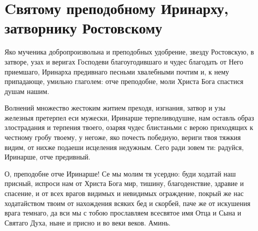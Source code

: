\section{Cвятому преподобному Иринарху, затворнику Ростовскому}\begin{mymulticols}


Яко мученика добропроизвольна и преподобных удобрение, звезду Ростовскую, в затворе, узах и веригах Господеви благоугодившаго и чудес благодать от Него приемшаго, Иринарха предивнаго песньми хвалебными почтим и, к нему припадающе, умильно глаголем: отче преподобне, моли Христа Бога спастися душам нашим. 


Волнений множество жестоким житием преходя, изгнания, затвор и узы железныя претерпел еси мужески, Иринарше терпеливодушне, нам оставль образ злострадания и терпения твоего, озаряя чудес блистаньми с верою приходящих к честному гробу твоему, у негоже, яко почесть победную, вериги твоя тяжкия видим, от нихже подаеши исцеления недужным. Сего ради зовем ти: радуйся, Иринарше, отче предивный. 


О, преподобне отче Иринарше! Се мы молим тя усердно: буди ходатай наш присный, испроси нам от Христа Бога мир, тишину, благоденствие, здравие и спасение, и от всех врагов видимых и невидимых ограждение, покрый же нас ходатайством твоим от нахождения всяких бед и скорбей, паче же от искушения врага темнаго, да вси мы с тобою прославляем всесвятое имя Отца и Сына и Святаго Духа, ныне и присно и во веки веков. Аминь. 

\end{mymulticols}

\mychapterending



